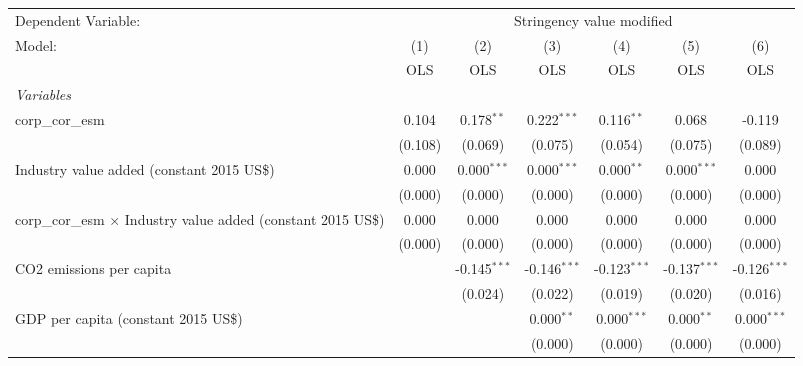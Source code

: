 
\begingroup
\centering
\begin{tabular}{lcccccc}
   \toprule
   Dependent Variable: & \multicolumn{6}{c}{Stringency value modified}\\
   Model:                                                                & (1)     & (2)            & (3)            & (4)            & (5)            & (6)\\  
                                                                         &  OLS    & OLS            & OLS            & OLS            & OLS            & OLS\\  
   \midrule
   \emph{Variables}\\
   corp\_cor\_esm                                                        & 0.104   & 0.178$^{**}$   & 0.222$^{***}$  & 0.116$^{**}$   & 0.068          & -0.119\\   
                                                                         & (0.108) & (0.069)        & (0.075)        & (0.054)        & (0.075)        & (0.089)\\   
   Industry value added (constant 2015 US\$)                             & 0.000   & 0.000$^{***}$  & 0.000$^{***}$  & 0.000$^{**}$   & 0.000$^{***}$  & 0.000\\   
                                                                         & (0.000) & (0.000)        & (0.000)        & (0.000)        & (0.000)        & (0.000)\\   
   corp\_cor\_esm $\times$ Industry value added (constant 2015 US\$)     & 0.000   & 0.000          & 0.000          & 0.000          & 0.000          & 0.000\\   
                                                                         & (0.000) & (0.000)        & (0.000)        & (0.000)        & (0.000)        & (0.000)\\   
   CO2 emissions per capita                                              &         & -0.145$^{***}$ & -0.146$^{***}$ & -0.123$^{***}$ & -0.137$^{***}$ & -0.126$^{***}$\\   
                                                                         &         & (0.024)        & (0.022)        & (0.019)        & (0.020)        & (0.016)\\   
   GDP per capita (constant 2015 US\$)                                   &         &                & 0.000$^{**}$   & 0.000$^{***}$  & 0.000$^{**}$   & 0.000$^{***}$\\   
                                                                         &         &                & (0.000)        & (0.000)        & (0.000)        & (0.000)\\   

\end{tabular}
